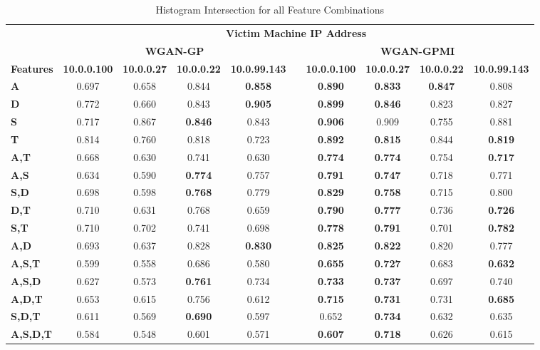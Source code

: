 \begin{table}[!htbp]
	\caption{Histogram Intersection for all Feature Combinations}
	\label{tab:inter}
	\centering
	\begin{adjustbox}{angle=90}
	\begin{tabular}{l|c|c|c|c|c|c|c|c|c|}
		\multicolumn{1}{c|}{} & \multicolumn{9}{c|}{\textbf{Victim Machine IP Address}} \\
		\multicolumn{1}{c|}{} & \multicolumn{4}{c|}{\textbf{WGAN-GP}} &  & \multicolumn{4}{c|}{\textbf{WGAN-GPMI}} \\
		\multicolumn{1}{c|}{\textbf{Features}} & \textbf{10.0.0.100} & \textbf{10.0.0.27} & \textbf{10.0.0.22} & \textbf{10.0.99.143} & \textbf{} & \textbf{10.0.0.100} & \textbf{10.0.0.27} & \textbf{10.0.0.22} & \textbf{10.0.99.143} \\ \hline
		\textbf{A} & 0.697 & 0.658 & 0.844 & \textbf{0.858} &  & \textbf{0.890} & \textbf{0.833} & \textbf{0.847} & 0.808 \\
		\textbf{D} & 0.772 & 0.660 & 0.843 & \textbf{0.905} &  & \textbf{0.899} & \textbf{0.846} & 0.823 & 0.827 \\
		\textbf{S} & 0.717 & 0.867 & \textbf{0.846} & 0.843 &  & \textbf{0.906} & 0.909 & 0.755 & 0.881 \\
		\textbf{T} & 0.814 & 0.760 & 0.818 & 0.723 &  & \textbf{0.892} & \textbf{0.815} & 0.844 & \textbf{0.819} \\ \hline
		\textbf{A,T} & 0.668 & 0.630 & 0.741 & 0.630 &  & \textbf{0.774} & \textbf{0.774} & 0.754 & \textbf{0.717} \\
		\textbf{A,S} & 0.634 & 0.590 & \textbf{0.774} & 0.757 &  & \textbf{0.791} & \textbf{0.747} & 0.718 & 0.771 \\
		\textbf{S,D} & 0.698 & 0.598 & \textbf{0.768} & 0.779 &  & \textbf{0.829} & \textbf{0.758} & 0.715 & 0.800 \\
		\textbf{D,T} & 0.710 & 0.631 & 0.768 & 0.659 &  & \textbf{0.790} & \textbf{0.777} & 0.736 & \textbf{0.726} \\
		\textbf{S,T} & 0.710 & 0.702 & 0.741 & 0.698 &  & \textbf{0.778} & \textbf{0.791} & 0.701 & \textbf{0.782} \\
		\textbf{A,D} & 0.693 & 0.637 & 0.828 & \textbf{0.830} &  & \textbf{0.825} & \textbf{0.822} & 0.820 & 0.777 \\ \hline
		\textbf{A,S,T} & 0.599 & 0.558 & 0.686 & 0.580 &  & \textbf{0.655} & \textbf{0.727} & 0.683 & \textbf{0.632} \\
		\textbf{A,S,D} & 0.627 & 0.573 & \textbf{0.761} & 0.734 &  & \textbf{0.733} & \textbf{0.737} & 0.697 & 0.740 \\
		\textbf{A,D,T} & 0.653 & 0.615 & 0.756 & 0.612 &  & \textbf{0.715} & \textbf{0.731} & 0.731 & \textbf{0.685} \\
		\textbf{S,D,T} & 0.611 & 0.569 & \textbf{0.690} & 0.597 &  & 0.652 & \textbf{0.734} & 0.632 & 0.635 \\ \hline
		\textbf{A,S,D,T} & 0.584 & 0.548 & 0.601 & 0.571 &  & \textbf{0.607} & \textbf{0.718} & 0.626 & 0.615 \\
	\end{tabular}
	\end{adjustbox}
\end{table}

